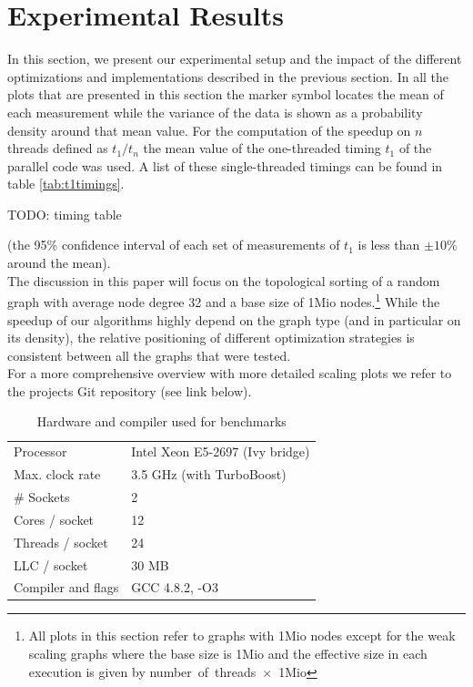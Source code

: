 \section{Experimental Results}\label{sec:exp}
%
In this section, we present our experimental setup and the impact of the different optimizations and implementations described in the previous section.
%
In all the plots that are presented in this section the marker symbol locates the mean of each measurement while the variance of the data is shown as a probability density around that mean value.
For the computation of the speedup on $n$ threads defined as $t_1/t_n$ the mean value of the one-threaded timing $t_1$ of the parallel code was used.
A list of these single-threaded timings can be found in table \ref{tab:t1timings}. 
\par\medskip
{\Large TODO: timing table}
\par\medskip
(the 95\% confidence interval of each set of measurements of $t_1$ is less than $\pm 10\%$ around the mean). \\
The discussion in this paper will focus on the topological sorting of a random graph with average node degree 32 and a base size of 1Mio nodes.\footnote{All plots in this section refer to graphs with 1Mio nodes except for the weak scaling graphs where the base size is 1Mio and the effective size in each execution is given by number~of~threads~$\times$~1Mio} 
While the speedup of our algorithms highly depend on the graph type (and in particular on its density), the relative positioning of different optimization strategies is consistent between all the graphs that were tested. \\
For a more comprehensive overview with more detailed scaling plots we refer to the projects Git repository (see link below).

  \begin{table}[h]
    \centering
    \begin{tabular}{ll}
    \toprule
    Processor        & Intel Xeon E5-2697 (Ivy bridge) \\
    Max. clock rate  & 3.5 GHz (with TurboBoost)\\
    \# Sockets       & 2 \\
    Cores / socket   & 12 \\
    Threads / socket & 24 \\
    LLC / socket     & 30 MB \\
    \midrule
    Compiler and flags & GCC 4.8.2, -O3\\
    \bottomrule
    \end{tabular}
    \caption{Hardware and compiler used for benchmarks}
    \label{tab:hardware}
  \end{table}
 
